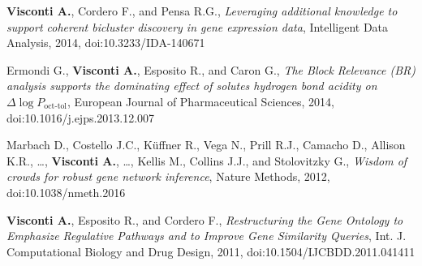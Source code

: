 {\begin{itemize}
		 \textbf{Visconti A.}, Cordero F., and Pensa R.G., \emph{Leveraging additional knowledge to support coherent bicluster discovery in gene expression data}, Intelligent Data Analysis, 2014, doi:10.3233/IDA-140671
	
		 Ermondi G., \textbf{Visconti A.}, Esposito R., and Caron G., \emph{The Block Relevance (BR) analysis supports the dominating effect of solutes hydrogen bond acidity on $\Delta \log P_{\text{oct-tol}}$}, European Journal of Pharmaceutical Sciences, 2014, doi:10.1016/j.ejps.2013.12.007
		
		 Marbach D., Costello J.C., K\"{u}ffner R., Vega N., Prill R.J., Camacho D., Allison K.R., \dots, \textbf{Visconti A.}, \dots, Kellis M., Collins J.J., and Stolovitzky G., \emph{Wisdom of crowds for robust gene network inference}, Nature Methods, 2012, doi:10.1038/nmeth.2016
		
		 \textbf{Visconti A.}, Esposito R., and Cordero F., \emph{Restructuring the Gene Ontology to Emphasize Regulative Pathways and to Improve Gene Similarity Queries}, Int. J. Computational Biology and Drug Design, 2011, doi:10.1504/IJCBDD.2011.041411


	\end{itemize}
}


\vspace{0.4cm}



